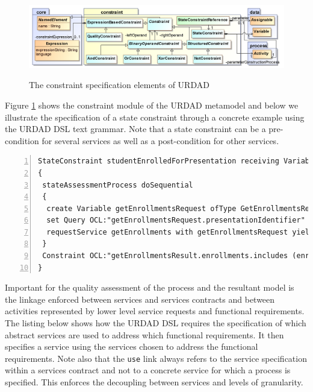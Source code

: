 \begin{figure}[thbp]
  \centering
  \includegraphics{constraint}\\   
  \caption{The constraint specification elements of URDAD}
  \label{fig:constraintModule}
\end{figure}

Figure \ref{fig:constraintModule} shows the constraint module of the URDAD metamodel and below we illustrate the specification of a state constraint through a concrete example using the URDAD DSL text grammar. Note that a state constraint can be a pre-condition for several services as well as a post-condition for other services.

\lstset{language=urdad,caption=Specifying a state constraint in the textual URDAD DSL syntax.,label=constraintTextSyntax}
\begin{lstlisting}[numbers=left,escapechar=|]
StateConstraint studentEnrolledForPresentation receiving Variable enrollForPresentationRequest ofType EnrollForPresentationRequest
{
 stateAssessmentProcess doSequential
 {
  create Variable getEnrollmentsRequest ofType GetEnrollmentsRequest
  set Query OCL:"getEnrollmentsRequest.presentationIdentifier" equalTo Query OCL:"enrollForPresentationRequest.presentationIdentifier"
  requestService getEnrollments with getEnrollmentsRequest yielding Variable getEnrollmentsResult ofType GetEnrollmentsResult
 }
 Constraint OCL:"getEnrollmentsResult.enrollments.includes (enrollForPresentationRequest.personIdentifier)"
}
\end{lstlisting}

Important for the quality assessment of the process and the resultant model is the linkage enforced between services and services contracts and between activities represented by lower level service requests and functional requirements. The listing below shows how the URDAD DSL requires the specification of which abstract services are used to address which functional requirements. It then specifies a service using the services chosen to address the functional requirements. Note also that the \verb+use+ link always refers to the service specification within a services contract and not to a concrete service for which a process is specified. This enforces the decoupling between services and levels of granularity.

